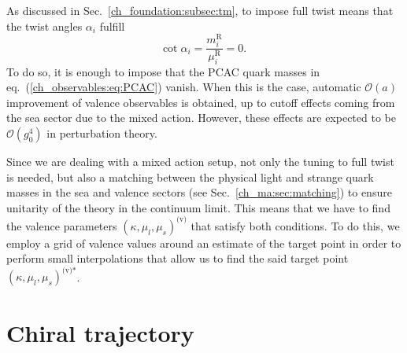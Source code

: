 As discussed in Sec.~\ref{ch_foundation:subsec:tm}, to impose full twist means that the twist angles $\alpha_i$ fulfill
\begin{equation}
{\textrm{cot}}\;\alpha_i=\frac{m_i^{\textrm{R}}}{\mu_i^{\textrm{R}}}=0.
\end{equation}
To do so, it is enough to impose that the PCAC quark masses in eq.~(\ref{ch_observables:eq:PCAC}) vanish. When this is the case, automatic $\mathcal{O}(a)$ improvement of valence observables is obtained, up to cutoff effects coming from the sea sector due to the mixed action. However, these effects are expected to be $\mathcal{O}(g_0^4)$ in perturbation theory.

Since we are dealing with a mixed action setup, not only the tuning to full twist is needed, but also a matching between the physical light and strange quark masses in the sea and valence sectors (see Sec.~\ref{ch_ma:sec:matching}) to ensure unitarity of the theory in the continuum limit. This means that we have to find the valence parameters $\left(\kappa,\mu_l,\mu_s\right)^{\textrm{(v)}}$ that satisfy both conditions. To do this, we employ a grid of valence values around an estimate of the target point in order to perform small interpolations that allow us to find the said target point $\left(\kappa,\mu_l,\mu_s\right)^{\textrm{(v)*}}$.


\section{Chiral trajectory}
\label{ch_ma:sec:chiral_traj}

